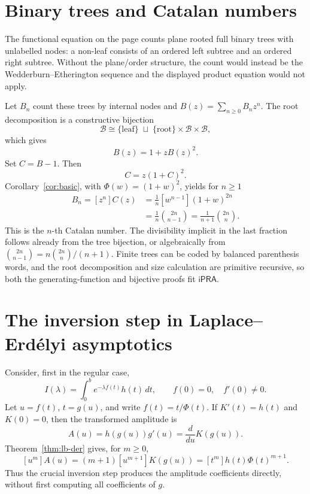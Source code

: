 \documentclass[11pt]{article}
\theoremstyle{definition}
\newcommand{\ipra}{\mathsf{iPRA}}
\newcommand{\B}{\mathcal B}
\begin{document}
\section{Binary trees and Catalan numbers}\label{sec:catalan}

The functional equation on the page counts plane rooted full binary trees with
unlabelled nodes: a non-leaf consists of an ordered left subtree and an ordered
right subtree.  Without the plane/order structure, the count would instead be
the Wedderburn--Etherington sequence and the displayed product equation would
not apply.

Let \(B_n\) count these trees by internal nodes and
\(B(z)=\sum_{n\ge0}B_nz^n\).  The root decomposition is a constructive
bijection
\[
 \B\cong\{\text{leaf}\}\;\sqcup\;
 \{\text{root}\}\times\B\times\B,
\]
which gives
\[
 B(z)=1+zB(z)^2.
\]
Set \(C=B-1\).  Then
\[
 C=z(1+C)^2.
\]
Corollary~\ref{cor:basic}, with \(\Phi(w)=(1+w)^2\), yields for \(n\ge1\)
\begin{align*}
 B_n=[z^n]C(z)
 &=\frac1n[w^{n-1}](1+w)^{2n}\\
 &=\frac1n\binom{2n}{n-1}
 =\frac1{n+1}\binom{2n}{n}.
\end{align*}
This is the \(n\)-th Catalan number.  The divisibility implicit in the last
fraction follows already from the tree bijection, or algebraically from
\(\binom{2n}{n-1}=n\binom{2n}{n}/(n+1)\).  Finite trees can be coded by balanced
parenthesis words, and the root decomposition and size calculation are
primitive recursive, so both the generating-function and bijective proofs fit
\(\ipra\).

\section{The inversion step in Laplace--Erd\'elyi asymptotics}\label{sec:laplace}

Consider, first in the regular case,
\[
 I(\lambda)=\int_0^b e^{-\lambda f(t)}h(t)\,dt,
 \qquad f(0)=0,\quad f'(0)\ne0.
\]
Let \(u=f(t)\), \(t=g(u)\), and write \(f(t)=t/\Phi(t)\).  If \(K'(t)=h(t)\)
and \(K(0)=0\), then the transformed amplitude is
\[
 A(u)=h(g(u))g'(u)=\frac{d}{du}K(g(u)).
\]
Theorem~\ref{thm:lb-der} gives, for \(m\ge0\),
\begin{equation}\label{eq:laplace-coeff}
 [u^m]A(u)
 =(m+1)[u^{m+1}]K(g(u))
 =[t^m]h(t)\Phi(t)^{m+1}.
\end{equation}
Thus the crucial inversion step produces the amplitude coefficients directly,
without first computing all coefficients of \(g\).
\end{document}
